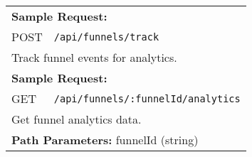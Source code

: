 \documentclass[11pt,a4paper]{article}
\begin{document}
\begin{longtable}{p{2.5cm}p{10cm}}
\multicolumn{2}{p{13cm}}{\textbf{Sample Request:}}
\begin{lstlisting}[language=json]
{"name":"New name","isEnabled":true}
\end{lstlisting} \\
POST & \texttt{/api/funnels/track} \\
\multicolumn{2}{p{13cm}}{Track funnel events for analytics.} \\
\multicolumn{2}{p{13cm}}{\textbf{Sample Request:}}
\begin{lstlisting}[language=json]
{"funnelId":"64f1a2b3c4d5e6f7a8b9c0d1","stageId":"64f1a2b3c4d5e6f7a8b9c0d2","eventType":"PageView","sessionId":"sess-123","metadata":{"ref":"ad"}}
\end{lstlisting} \\
GET & \texttt{/api/funnels/:funnelId/analytics} \\
\multicolumn{2}{p{13cm}}{Get funnel analytics data.} \\
\multicolumn{2}{p{13cm}}{\textbf{Path Parameters:} funnelId (string)} \\
\end{longtable}
\end{document}
